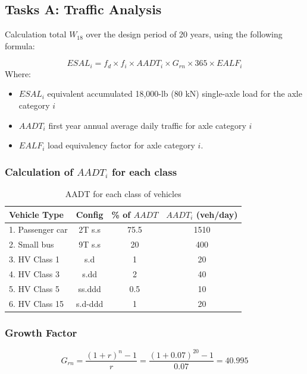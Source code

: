 \subsection{Tasks A: Traffic Analysis}
Calculation total $W_{18}$ over the design period of 20 years, using the following formula:

\begin{equation}
    ESAL_i = f_d \times f_i \times AADT_i \times G_{rn} \times 365 \times EALF_i
    \label{eq:esal_calculation}
\end{equation}
Where:

\begin{itemize}
    \item $ESAL_i$ equivalent accumulated 18,000-lb (80 kN) single-axle load for the axle category $i$
    \item $AADT_i$ first year annual average daily traffic for axle category $i$
    \item $EALF_i$ load equivalency factor for axle category $i$.
\end{itemize}
\subsubsection*{Calculation of $AADT_i$ for each class}
\begin{table}[H]
\centering
\begin{tabular}{|l|c|c|c|}
\hline
\textbf{Vehicle Type} & \textbf{Config} & \textbf{\% of} $AADT$ & $AADT_i$ \textbf{(veh/day)} \\
\hline
1. Passenger car  & 2T s.s   & 75.5 & 1510 \\
2. Small bus      & 9T s.s   & 20   & 400  \\
3. HV Class 1     & s.d      & 1    & 20   \\
4. HV Class 3     & s.dd     & 2    & 40   \\
5. HV Class 5     & ss.ddd   & 0.5  & 10   \\
6. HV Class 15    & s.d-ddd  & 1    & 20   \\
\hline
\end{tabular}
\caption{AADT for each class of vehicles}
\label{tab:aadt_vehicles}
\end{table}
\subsubsection*{Growth Factor}
\begin{equation*}
G_{rn} = \frac{(1+r)^n - 1}{r} = \frac{(1+0.07)^{20} - 1}{0.07} = 40.995
\end{equation*}
